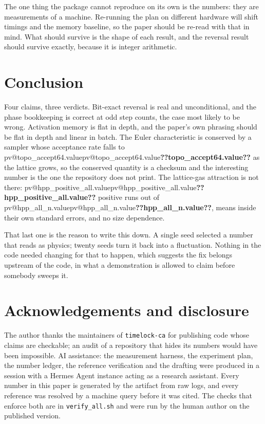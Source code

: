 \documentclass[11pt,a4paper]{article}
\makeatletter
\newcommand{\val}[1]{\ifcsname pv@#1\endcsname\csname pv@#1\endcsname\else\textbf{??#1??}\fi}
\makeatother
\begin{document}
The one thing the package cannot reproduce on its own is the numbers: they are measurements of a
machine. Re-running the plan on different hardware will shift timings and the memory baseline, so
the paper should be re-read with that in mind. What should survive is the shape of each result,
and the reversal result should survive exactly, because it is integer arithmetic.

\section{Conclusion}

Four claims, three verdicts. Bit-exact reversal is real and unconditional, and the phase
bookkeeping is correct at odd step counts, the case most likely to be wrong. Activation memory is
flat in depth, and the paper's own phrasing should be flat in depth and linear in batch. The
Euler characteristic is conserved by a sampler whose acceptance rate falls to
\val{topo_accept64.value} as the lattice grows, so the conserved quantity is a checksum and the
interesting number is the one the repository does not print. The lattice-gas attraction is not
there: \val{hpp_positive_all.value} positive runs out of \val{hpp_all_n.value}, means inside their
own standard errors, and no size dependence.

That last one is the reason to write this down. A single seed selected a number that reads as
physics; twenty seeds turn it back into a fluctuation. Nothing in the code needed changing for
that to happen, which suggests the fix belongs upstream of the code, in what a demonstration is
allowed to claim before somebody sweeps it.

\section*{Acknowledgements and disclosure}

The author thanks the maintainers of \texttt{timelock-ca} for publishing code whose claims are
checkable; an audit of a repository that hides its numbers would have been impossible. AI
assistance: the measurement harness, the experiment plan, the number ledger, the reference
verification and the drafting were produced in a session with a Hermes Agent instance acting as a
research assistant. Every number in this paper is generated by the artifact from raw logs, and
every reference was resolved by a machine query before it was cited. The checks that enforce both
are in \texttt{verify\_all.sh} and were run by the human author on the published version.
\end{document}
